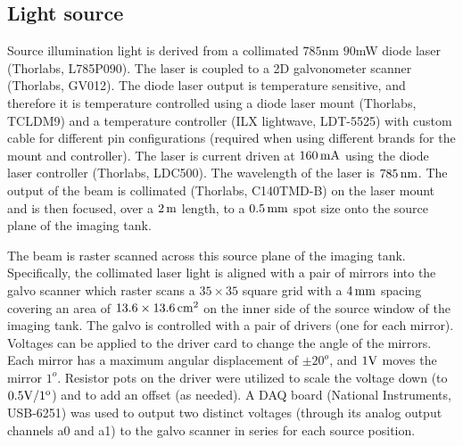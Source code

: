 \subsection{Light source}
Source illumination light is derived from a collimated $785$nm $90$mW  diode laser (Thorlabs, L785P090). The laser is coupled to a 2D galvonometer scanner (Thorlabs, GV012). The diode laser output is temperature sensitive, and therefore it is temperature controlled using a diode laser mount (Thorlabs, TCLDM9) and a temperature controller (ILX lightwave, LDT-5525) with custom cable for different pin configurations (required when using different brands for the mount and controller). The laser is current driven at $160\,{\rm mA}$ using the diode laser controller (Thorlabs, LDC500). The wavelength of the laser is $785\,{\rm nm}$. The output of the beam is collimated (Thorlabs, C140TMD-B) on the laser mount and is then focused, over a $2\,{\rm m}$ length, to a $0.5\,{\rm mm}$ spot size onto the source plane of the imaging tank.

The beam is raster scanned across this source plane of the imaging tank. Specifically, the collimated laser light is aligned with a pair of mirrors into the galvo scanner which raster scans a $35\times 35$ square grid with a $4\,{\rm mm}$ spacing covering an area of $13.6\times 13.6\,{\rm cm}^2$ on the inner side of the source window of the imaging tank. The galvo is controlled with a pair of drivers (one for each mirror). Voltages can be applied to the driver card to change the angle of the mirrors. Each mirror has a maximum angular displacement of $\pm 20^o$, and $1 \rm{V}$ moves the mirror $1^o$. Resistor pots on the driver were utilized to scale the voltage down (to $0.5 \rm{V}/1^o$) and to add an offset (as needed). A DAQ board (National Instruments, USB-6251) was used to output two distinct voltages (through its analog output channels a0 and a1) to the galvo scanner in series for each source position.

